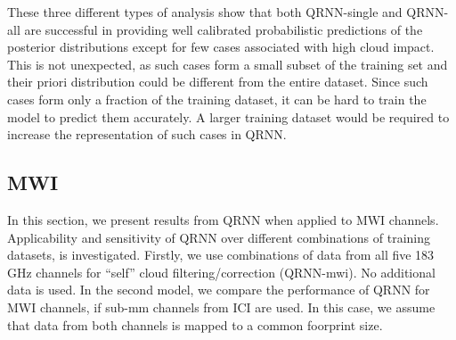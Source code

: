\documentclass[amt, manuscript]{copernicus}
\begin{document}
These three different types of analysis show that both QRNN-single and QRNN-all are successful in providing well calibrated probabilistic predictions of the posterior distributions except for few cases associated with high cloud impact. This is not unexpected, as such cases form a small subset of the training set and their priori distribution could be different from the entire dataset. Since such cases form only a fraction of the training dataset, it can be hard to train the model to predict them accurately. A larger training dataset would be required to increase the representation of such cases in QRNN.


\subsection{MWI}
%
In this section, we present results from QRNN when applied to MWI channels. Applicability and sensitivity of QRNN over different combinations of training datasets, is investigated. Firstly, we use combinations of data from all five 183\,GHz channels for ``self'' cloud filtering/correction (QRNN-mwi). No additional data is used. In the second model, we compare the performance of QRNN for MWI channels, if sub-mm channels from ICI are used. In this case, we assume that data from both channels is mapped to a common foorprint size.
\end{document}

